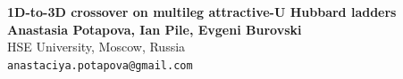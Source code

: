 \documentclass[a0,portrait]{a0poster}
\begin{document}


\begin{minipage}[b]{0.85\linewidth}
\veryHuge \color{NavyBlue} \textbf{1D-to-3D crossover on multileg attractive-U Hubbard ladders} \color{Black}\\[2cm] %
\huge \textbf{Anastasia Potapova, Ian Pile, Evgeni Burovski}\\[0.5cm] %
\huge HSE University, Moscow, Russia\\[0.4cm] %
\Large \texttt{anastaciya.potapova@gmail.com}\\
\end{minipage}
%
\vspace{0.8cm} %

\end{document}

